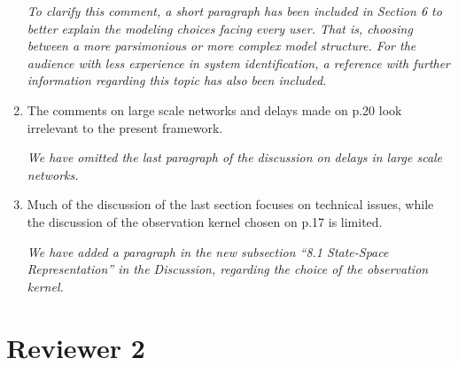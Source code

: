 \documentclass{article}
\newcommand{\parham}[1]{\textcolor{blue}{#1}}
\begin{document}
\begin{enumerate}
				
		\emph{To clarify this comment, a short paragraph has been included in Section 6 to better explain the modeling choices facing every user. That is, choosing between a more parsimonious or more complex model structure.  For the audience with less experience in system identification, a reference with further information regarding this topic has also been included.}
				
		\item The comments on large scale networks and delays made on p.20 look irrelevant to the present framework.
				
		\emph{We have omitted the last paragraph of the discussion on delays in large scale networks.}
				
		\item Much of the discussion of the last section focuses on technical issues, while the discussion of the observation kernel chosen on p.17 is limited.
				
		\emph{We have added a paragraph in the new subsection ``8.1 State-Space Representation'' in the Discussion, regarding the choice of the observation kernel.}

    \end{enumerate}
    
    \section{Reviewer 2}
    
\end{document}
